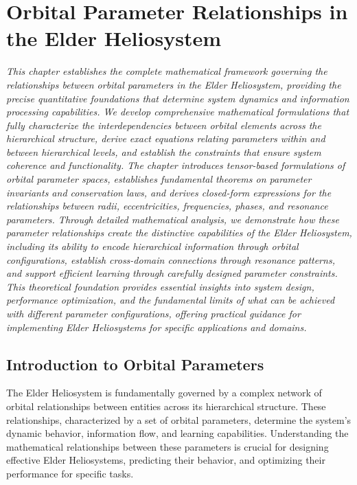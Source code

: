 \chapter{Orbital Parameter Relationships in the Elder Heliosystem}

\textit{This chapter establishes the complete mathematical framework governing the relationships between orbital parameters in the Elder Heliosystem, providing the precise quantitative foundations that determine system dynamics and information processing capabilities. We develop comprehensive mathematical formulations that fully characterize the interdependencies between orbital elements across the hierarchical structure, derive exact equations relating parameters within and between hierarchical levels, and establish the constraints that ensure system coherence and functionality. The chapter introduces tensor-based formulations of orbital parameter spaces, establishes fundamental theorems on parameter invariants and conservation laws, and derives closed-form expressions for the relationships between radii, eccentricities, frequencies, phases, and resonance parameters. Through detailed mathematical analysis, we demonstrate how these parameter relationships create the distinctive capabilities of the Elder Heliosystem, including its ability to encode hierarchical information through orbital configurations, establish cross-domain connections through resonance patterns, and support efficient learning through carefully designed parameter constraints. This theoretical foundation provides essential insights into system design, performance optimization, and the fundamental limits of what can be achieved with different parameter configurations, offering practical guidance for implementing Elder Heliosystems for specific applications and domains.}

\section{Introduction to Orbital Parameters}

The Elder Heliosystem is fundamentally governed by a complex network of orbital relationships between entities across its hierarchical structure. These relationships, characterized by a set of orbital parameters, determine the system's dynamic behavior, information flow, and learning capabilities. Understanding the mathematical relationships between these parameters is crucial for designing effective Elder Heliosystems, predicting their behavior, and optimizing their performance for specific tasks.

